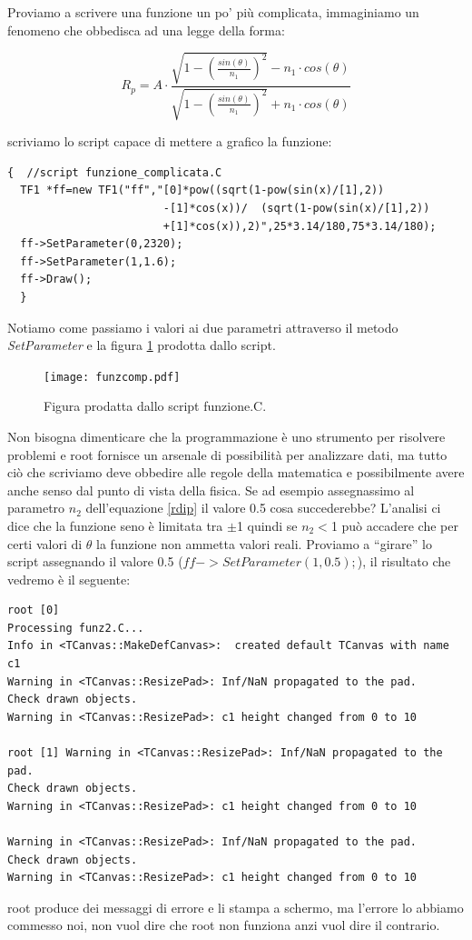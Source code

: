 \documentclass[11pt,fleqn]{book} %
\begin{document}
Proviamo a scrivere una funzione un po' più complicata, immaginiamo un fenomeno che obbedisca ad una legge della forma:

\begin{equation}
R_p=A\cdot\frac{\sqrt{1-(\frac{sin(\theta)}{n_1})^2}-n_1\cdot cos(\theta)}{\sqrt{1-(\frac{sin(\theta)}{n_1})^2}+n_1\cdot cos(\theta)} \label{rdip}
\end{equation}

scriviamo lo script capace di mettere a grafico la funzione:

\begin{verbatim}
{  //script funzione_complicata.C
  TF1 *ff=new TF1("ff","[0]*pow((sqrt(1-pow(sin(x)/[1],2))
                        -[1]*cos(x))/  (sqrt(1-pow(sin(x)/[1],2))
                        +[1]*cos(x)),2)",25*3.14/180,75*3.14/180);
  ff->SetParameter(0,2320);
  ff->SetParameter(1,1.6);
  ff->Draw();
  }
\end{verbatim}
Notiamo come passiamo i valori ai due parametri attraverso il metodo \textit{SetParameter} e la figura \ref{funzi2} prodotta dallo script. 
\begin{figure}
\centering
\texttt{[image: funzcomp.pdf]}
\caption{Figura prodatta dallo script funzione.C.\label{funzi2}}
\end{figure}

Non bisogna dimenticare che la programmazione è uno strumento per risolvere problemi e root fornisce un arsenale di possibilità per analizzare dati, ma tutto ciò che scriviamo deve obbedire alle regole della matematica e possibilmente avere anche senso dal punto di vista della fisica.
Se ad esempio assegnassimo al parametro $n_2$ dell'equazione \ref{rdip} il valore 0.5 cosa succederebbe? L'analisi ci dice che la funzione seno è limitata tra $\pm$1 quindi se $n_2<$1 può accadere che per certi valori di $\theta$ la funzione non ammetta valori reali. Proviamo a ``girare'' lo script assegnando il valore 0.5 ($ff->SetParameter(1,0.5);$), il risultato che vedremo è il seguente:
\begin{verbatim}
root [0] 
Processing funz2.C...
Info in <TCanvas::MakeDefCanvas>:  created default TCanvas with name c1
Warning in <TCanvas::ResizePad>: Inf/NaN propagated to the pad. 
Check drawn objects.
Warning in <TCanvas::ResizePad>: c1 height changed from 0 to 10

root [1] Warning in <TCanvas::ResizePad>: Inf/NaN propagated to the pad.
Check drawn objects.
Warning in <TCanvas::ResizePad>: c1 height changed from 0 to 10

Warning in <TCanvas::ResizePad>: Inf/NaN propagated to the pad. 
Check drawn objects.
Warning in <TCanvas::ResizePad>: c1 height changed from 0 to 10
\end{verbatim}
root produce dei messaggi di errore e li stampa a schermo, ma l'errore lo abbiamo commesso noi, non vuol dire che root non funziona anzi vuol dire il contrario.
\end{document}
